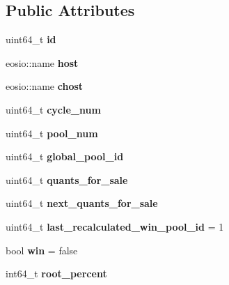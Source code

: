 \subsection*{Public Attributes}
\begin{DoxyCompactItemize}
\item 
\mbox{\label{structbalance_a3077d63cadc45e37ad1c5dcc5e94ccfd}} 
uint64\+\_\+t {\bfseries id}
\item 
\mbox{\label{structbalance_aa1b6b2cbd5b9d70037404e5a2ad5dda0}} 
eosio\+::name {\bfseries host}
\item 
\mbox{\label{structbalance_a5ec1543098c124fe30f27c214cb8160e}} 
eosio\+::name {\bfseries chost}
\item 
\mbox{\label{structbalance_ad2ed41f1dfbf60f812a7ac023345930e}} 
uint64\+\_\+t {\bfseries cycle\+\_\+num}
\item 
\mbox{\label{structbalance_aca9b81261b5367beeaa6fe6e294205ca}} 
uint64\+\_\+t {\bfseries pool\+\_\+num}
\item 
\mbox{\label{structbalance_a3d37c261621463b5391b79c5db5e1dce}} 
uint64\+\_\+t {\bfseries global\+\_\+pool\+\_\+id}
\item 
\mbox{\label{structbalance_abbddf497106a7fc59dcce1a0541c657b}} 
uint64\+\_\+t {\bfseries quants\+\_\+for\+\_\+sale}
\item 
\mbox{\label{structbalance_aa6c36478cc488c615624e25f53197901}} 
uint64\+\_\+t {\bfseries next\+\_\+quants\+\_\+for\+\_\+sale}
\item 
\mbox{\label{structbalance_ad3d998acc801aa7e732e0d4c49fc0040}} 
uint64\+\_\+t {\bfseries last\+\_\+recalculated\+\_\+win\+\_\+pool\+\_\+id} = 1
\item 
\mbox{\label{structbalance_aeacfdfcdb555b1bc12109466764fb21f}} 
bool {\bfseries win} = false
\item 
\mbox{\label{structbalance_a43060a5a2d2870df3223afdede2a1902}} 
int64\+\_\+t {\bfseries root\+\_\+percent}

\end{DoxyCompactItemize}
